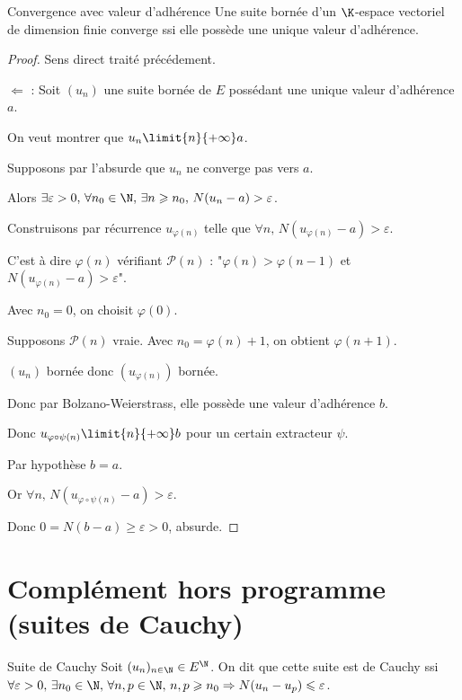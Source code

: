 \begin{theoreme}{Convergence avec valeur d'adhérence}{}
    Une suite bornée d'un $\K$-espace vectoriel de dimension finie converge ssi elle possède
    une unique valeur d'adhérence.
\end{theoreme}


\begin{proof}
    Sens direct traité précédement. 

    $\Leftarrow$ : Soit $(u_n)$ une suite bornée de $E$ possédant une unique valeur d'adhérence $a$.

    On veut montrer que $u_n \limit{n}{+\infty} a$.

    Supposons par l'absurde que $u_n$ ne converge pas vers $a$.

    Alors $\exists \varepsilon > 0, \, \forall n_0 \in \N, \, \exists n \geqslant n_0, \, N(u_n - a) > \varepsilon$.

    Construisons par récurrence $u_{\varphi(n)}$ telle que $\forall n, \, N(u_{\varphi(n)} - a) > \varepsilon$.

    C'est à dire $\varphi(n) $ vérifiant $\mathscr P(n)$ : "$\varphi(n) > \varphi(n - 1)$ et $N(u_{\varphi(n)} - a) > \varepsilon$".

    Avec $n_0 = 0$, on choisit $\varphi(0)$.

    Supposons $\mathscr P(n)$ vraie. Avec $n_0 = \varphi(n) + 1$, on obtient $\varphi(n + 1)$.

    $(u_n)$ bornée donc $(u_{\varphi(n)})$ bornée.

    Donc par Bolzano-Weierstrass, elle possède une valeur d'adhérence $b$.

    Donc $u_{\varphi \circ \psi(n)} \limit{n}{+\infty} b$ pour un certain extracteur $\psi$.

    Par hypothèse $b = a$. 

    Or $\forall n, \, N(u_{\varphi \circ \psi(n)} - a) > \varepsilon$.

    Donc $ 0 = N(b - a) \geqslant \varepsilon > 0$, absurde. 

\end{proof}

\section{Complément hors programme (suites de Cauchy)}

\begin{definition}{Suite de Cauchy}{}
    Soit $(u_n)_{n \in \N} \in E^{\N}$. On dit que cette suite est de Cauchy ssi 
    $\forall \varepsilon > 0, \, \exists n_0 \in \N, \, \forall n, p \in \N, \, n, p \geqslant n_0 \Rightarrow N(u_n - u_p) \leqslant \varepsilon$.
\end{definition}

